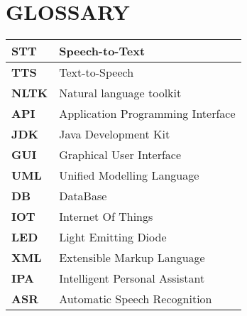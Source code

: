 \chapter{GLOSSARY}
\begin{table}[ht]
\centering
\begin{tabular}{ |p{3cm}|p{8cm}|  }
 \hline
\textbf{STT}& Speech-to-Text \\
\hline
\textbf{TTS} & Text-to-Speech\\
\hline
\textbf{NLTK}&  Natural language toolkit\\
\hline
\textbf{API} & Application Programming Interface\\
\hline
\textbf{JDK} & Java Development Kit\\
\hline
\textbf{GUI} & Graphical User Interface\\
\hline
\textbf{UML} & Unified Modelling Language\\
\hline
\textbf{DB}&  DataBase\\
\hline
\textbf{IOT}&  Internet Of Things\\
\hline
\textbf{LED}&  Light Emitting Diode\\
\hline
\textbf{XML}&  Extensible Markup Language\\
\hline
\textbf{IPA}&  Intelligent Personal Assistant\\
\hline
\textbf{ASR}&  Automatic Speech Recognition\\
\hline






\end{tabular}

\end{table}

